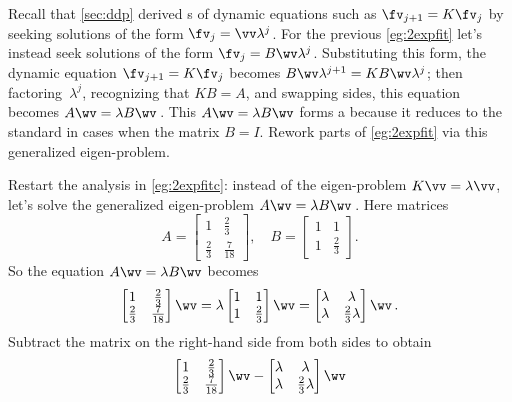 \begin{example} \label{eg:2expfit2}
Recall that \cref{sec:ddp} derived s of dynamic equations such as \(\fv_{j+1}=K\fv_j\) by seeking solutions of the form \(\fv_j=\vv\lambda^j\).
For the previous \cref{eg:2expfit} let's instead seek solutions of the form \(\fv_j=B\wv\lambda^j\).
Substituting this form, the dynamic equation \(\fv_{j+1}=K\fv_j\) becomes \(B\wv\lambda^{j+1}=KB\wv\lambda^j\); then factoring~\(\lambda^j\), recognizing that \(KB=A\), and swapping sides, this equation becomes \(A\wv=\lambda B\wv\)\,.
This \(A\wv=\lambda B\wv\) forms a  because it reduces to the standard  in cases when the matrix \(B=I\).
Rework parts of \cref{eg:2expfit} via this generalized eigen-problem.

\begin{solution} 
Restart the analysis in \cref{eg:2expfitc}: instead of the eigen-problem \(K\vv=\lambda\vv\), let's solve the generalized eigen-problem \(A\wv=\lambda B\wv\)\,.
Here matrices
\begin{equation*}
A=\begin{bmatrix} 1&\frac23\\\frac23&\frac7{18} \end{bmatrix},\quad
B=\begin{bmatrix} 1&1\\1&\frac23 \end{bmatrix}.
\end{equation*}
So the equation \(A\wv=\lambda B\wv\) becomes
\begin{equation*}
\begin{bmatrix} 1&\frac23\\\frac23&\frac7{18} \end{bmatrix}\wv
=\lambda \begin{bmatrix} 1&1\\1&\frac23 \end{bmatrix}\wv
= \begin{bmatrix} \lambda&\lambda\\\lambda&\frac23\lambda \end{bmatrix}\wv\,.
\end{equation*}
Subtract the matrix on the right-hand side from both sides to obtain
\begin{equation*}
\begin{bmatrix} 1&\frac23\\\frac23&\frac7{18} \end{bmatrix}\wv
- \begin{bmatrix} \lambda&\lambda\\\lambda&\frac23\lambda \end{bmatrix}\wv 

\end{equation*}
\end{solution}
\end{example}
